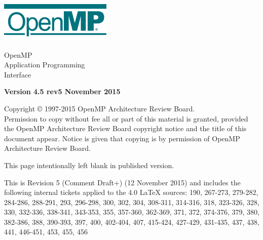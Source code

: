 
  \begin{titlepage}
    \begin{flushleft}
     \hspace{-6em} \includegraphics[width=0.4\textwidth]{openmp-logo.png}
    \end{flushleft}

    \begin{adjustwidth}{-0.75in}{0in}
    \begin{center}
      \Huge
      \textsf{OpenMP\\Application Programming\\Interface}

      \vspace{0.5in}\textsf{    }\vspace{-0.7in}
      \normalsize

      \vspace{1.0in}

      \textbf{Version 4.5 rev5 November 2015}
    \end{center}
    \end{adjustwidth}

    \vspace{3.0in}

\begin{adjustwidth}{0pt}{1em}\setlength{\parskip}{0.25\baselineskip}%
Copyright © 1997-2015 OpenMP Architecture Review Board.\\
Permission to copy without fee all or part of this material is granted,
provided the OpenMP Architecture Review Board copyright notice and
the title of this document appear. Notice is given that copying is by
permission of OpenMP Architecture Review Board.\end{adjustwidth}

  \end{titlepage}


\clearpage
\thispagestyle{empty}
\phantom{a}
This page intentionally left blank in published version.

This is Revision 5 (Comment Draft+) (12 November 2015) and includes the 
following internal tickets applied to the 4.0 LaTeX sources: 
190, 267-273, 279-282, 284-286, 288-291, 293, 296-298, 300, 302, 304, 308-311, 
314-316, 318, 323-326, 328, 330, 332-336, 338-341, 343-353, 355, 357-360, 
362-369, 371, 372, 374-376, 379, 380, 382-386, 388, 390-393, 397, 400,
402-404, 407, 415-424, 427-429, 431-435, 437, 438, 441, 446-451, 453, 455, 456


\vfill


